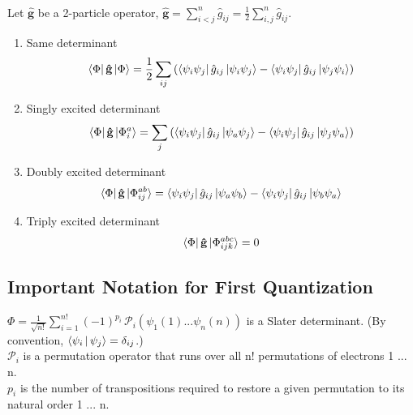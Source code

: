 \documentclass{article}
\newcommand{\vsp}{\vspace{0.2cm}}
\newcommand{\suml}{\sum\limits}
\newcommand{\boldg}{\ensuremath{\mathbf{\hat{g}}}}
\newcommand{\pmt}{\ensuremath{\mathcal{P}}}
\begin{document}
 \vspace{0.3cm} \\
Let $\boldg$ be a 2-particle operator, $\boldg = \suml_{i<j}^n \hat{g}_{ij} = \frac{1}{2}\suml_{i,j}^n \hat{g}_{ij} $.
\begin{enumerate}
\item Same determinant
\begin{equation}
   \bra{\Phi}
      \boldg
   \ket{\Phi} 
= 
   \frac{1}{2} 
   \suml_{ij} 
      \left( 
         \bra{\psi_i \psi_j}
            \hat{g}_{ij} 
            \ket{\psi_i \psi_j} 
       -  
          \bra{\psi_i \psi_j}
             \hat{g}_{ij} 
          \ket{\psi_j \psi_i} 
       \right)
\end{equation}
\item Singly excited determinant
\begin{equation}
   \bra{\Phi}
      \boldg
   \ket{\Phi_i^a} 
= 
   \suml_{j} 
      \left( 
         \bra{\psi_i \psi_j}
             \hat{g}_{ij}
          \ket{\psi_a \psi_j} 
       - 
          \bra{\psi_i \psi_j} 
             \hat{g}_{ij}
          \ket{\psi_j \psi_a} 
       \right)
\end{equation}
\item Doubly excited determinant
\begin{equation}
   \bra{\Phi}
      \boldg
    \ket{\Phi_{ij}^{ab}} 
= 
   \bra{\psi_i \psi_j}
      \hat{g}_{ij} 
   \ket{\psi_a \psi_b} 
-
   \bra{\psi_i \psi_j}
      \hat{g}_{ij} 
   \ket{\psi_b \psi_a}
\end{equation}
\item Triply excited determinant
\begin{equation}
   \bra{\Phi}
      \boldg
   \ket{\Phi_{ijk}^{abc}} 
= 
   0
\end{equation}
\end{enumerate}

\subsection{Important Notation for First Quantization}
$\Phi = \frac{1}{\sqrt{n!}} \suml^{n!}_{i=1} (-1)^{p_{i}} \, \mathcal{P}_i \left(\psi_1(1) ... \psi_n(n)\right)$ is a Slater determinant. (By convention, $\Braket{\psi_i | \psi_j} = \delta_{ij}$.) \vsp \\
$\pmt_i$ is a permutation operator that runs over all n! permutations of electrons 1 ... n. \vsp \\
$p_i$ is the number of transpositions required to restore a given permutation to its natural order 1 ... n. 
\end{document}
